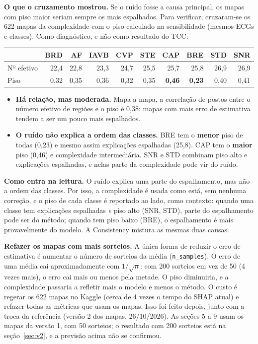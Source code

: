 \documentclass[11pt,a4paper]{article}
\begin{document}
\textbf{O que o cruzamento mostrou.} Se o ruído fosse a causa principal, os mapas com piso maior seriam sempre os mais espalhados. Para verificar, cruzaram-se os 622 mapas da complexidade com o piso calculado na sensibilidade (mesmos ECGs e classes). Como diagnóstico, e não como resultado do TCC:
\begin{center}\small
\begin{tabular}{lrrrrrrrrr}
\toprule
& \textbf{BRD} & \textbf{AF} & \textbf{IAVB} & \textbf{CVP} & \textbf{STE} & \textbf{CAP} & \textbf{BRE} & \textbf{STD} & \textbf{SNR} \\
\midrule
Nº efetivo & 22,4 & 22,8 & 23,3 & 24,7 & 25,5 & 25,7 & 25,8 & 26,9 & 26,9 \\
Piso & 0,32 & 0,35 & 0,36 & 0,32 & 0,35 & \textbf{0,46} & \textbf{0,23} & 0,40 & 0,41 \\
\bottomrule
\end{tabular}
\end{center}
\begin{itemize}
\item \textbf{Há relação, mas moderada.} Mapa a mapa, a correlação de postos entre o número efetivo de regiões e o piso é 0,38: mapas com mais erro de estimativa tendem a ser um pouco mais espalhados.
\item \textbf{O ruído não explica a ordem das classes.} BRE tem o \textbf{menor} piso de todas (0,23) e mesmo assim explicações espalhadas (25,8). CAP tem o \textbf{maior} piso (0,46) e complexidade intermediária. SNR e STD combinam piso alto e explicações espalhadas, e nelas parte da complexidade pode vir do ruído.
\end{itemize}
\textbf{Como entra na leitura.} O ruído explica uma parte do espalhamento, mas não a ordem das classes. Por isso, a complexidade é usada como está, sem nenhuma correção, e o piso de cada classe é reportado ao lado, como contexto: quando uma classe tem explicações espalhadas \textit{e} piso alto (SNR, STD), parte do espalhamento pode ser do método; quando tem piso baixo (BRE), o espalhamento é mais provavelmente do modelo. A Consistency mistura as mesmas duas causas.

\textbf{Refazer os mapas com mais sorteios.} A única forma de reduzir o erro de estimativa é aumentar o número de sorteios da média (\texttt{n\_samples}). O erro de uma média cai aproximadamente com $1/\sqrt{n}$: com 200 sorteios em vez de 50 (4 vezes mais), o erro cai mais ou menos pela metade. O piso diminuiria, e a complexidade passaria a refletir mais o modelo e menos o método. O custo é regerar os 622 mapas no Kaggle (cerca de 4 vezes o tempo do SHAP atual) e refazer todas as métricas que usam os mapas. Isso foi feito depois, junto com a troca da referência (versão 2 dos mapas, 26/10/2026). As seções 5 a 9 usam os mapas da versão 1, com 50 sorteios; o resultado com 200 sorteios está na seção~\ref{sec:v2}, e a previsão acima não se confirmou.
\end{document}
